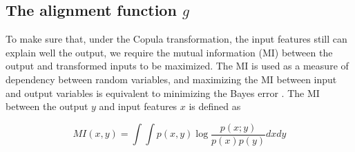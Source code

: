 \documentclass{article}
\newcommand{\todo}[1]{\textcolor{red}{#1}}
\begin{document}

	
	
	
	
\subsection{The alignment function $g$ } 
	


To make sure that, under the Copula transformation, the input features still can explain well the output, we require the mutual information (MI) between the output and transformed inputs to be maximized. The MI is used as a measure of dependency between random variables, and maximizing the MI between input and output variables is equivalent to minimizing the Bayes error \cite{fano1961transmission}. The MI between the output $y$ and input features $x$ is defined as

\begin{equation} MI(x,y)=\int \int p(x,y) \log \frac{p(x;y)}{p(x)p(y)} dxdy \end{equation}


		
\end{document}
